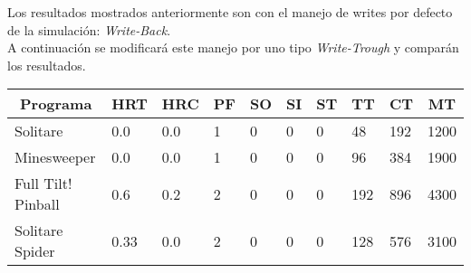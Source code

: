 \documentclass{article}
\begin{document}
Los resultados mostrados anteriormente son con el manejo de writes por defecto de la simulación: \textit{Write-Back}.\\

A continuación se modificará este manejo por uno tipo \textit{Write-Trough} y comparán los resultados.
\begin{table}[H]
\begin{tabular}{|l|l|l|l|l|l|l|l|l|l|}
\hline
\multicolumn{1}{|c|}{\textbf{Programa}} & \multicolumn{1}{c|}{\textbf{HRT}} & \multicolumn{1}{c|}{\textbf{HRC}} & \multicolumn{1}{c|}{\textbf{PF}} & \multicolumn{1}{c|}{\textbf{SO}} & \multicolumn{1}{c|}{\textbf{SI}} & \multicolumn{1}{c|}{\textbf{ST}} & \multicolumn{1}{c|}{\textbf{TT}} & \multicolumn{1}{c|}{\textbf{CT}} & \multicolumn{1}{c|}{\textbf{MT}} \\ \hline
Solitare                                & 0.0                               & 0.0                               & 1                                & 0                                & 0                                & 0                                & 48                               & 192                              & 1200                             \\ \hline
Minesweeper                             & 0.0                               & 0.0                               & 1                                & 0                                & 0                                & 0                                & 96                               & 384                              & 1900                             \\ \hline
Full Tilt! Pinball                      & 0.6                               & 0.2                               & 2                                & 0                                & 0                                & 0                                & 192                              & 896                              & 4300                             \\ \hline
Solitare Spider                         & 0.33                              & 0.0                               & 2                                & 0                                & 0                                & 0                                & 128                              & 576                              & 3100                             \\ \hline
\end{tabular}
\end{table}
\end{document}
